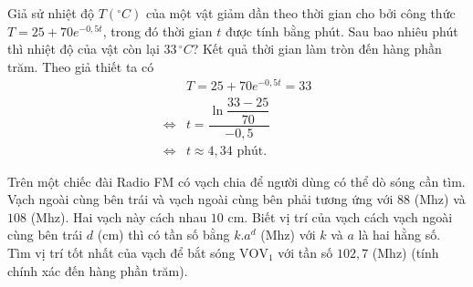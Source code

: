 \begin{bt}%

	Giả sử nhiệt độ $T({}^\circ C)$ của một vật giảm dần theo thời gian cho bởi công thức $T = 25 + 70e^{-0{,}5t}$, trong đó thời gian $t$ được tính bằng phút. Sau bao nhiêu phút thì nhiệt độ của vật còn lại $33\, {}^\circ C$? Kết quả thời gian làm tròn đến hàng phần trăm.
	\loigiai
	{
		Theo giả thiết ta có
		\begin{align*}
			&T = 25 + 70e^{-0{,}5t} = 33\\
			\Leftrightarrow &t = \dfrac{\ln\dfrac{33-25}{70}}{-0{,}5}\\
			\Leftrightarrow &t \approx 4{,}34 \text{ phút}.
		\end{align*}
	}
\end{bt}

\begin{bt}%

	Trên một chiếc đài Radio FM có vạch chia để người dùng có thể dò sóng cần tìm. Vạch ngoài cùng bên trái và vạch ngoài cùng bên phải tương ứng với $88$ (Mhz) và $108$ (Mhz). Hai vạch này cách nhau $10$ cm. Biết vị trí của vạch cách vạch ngoài cùng bên trái $d$ (cm) thì có tần số bằng $k.a^d$ (Mhz) với $k$ và $a$ là hai hằng số. Tìm vị trí tốt nhất của vạch để bắt sóng $\mathrm{VOV}_1$ với tần số $102{,}7$ (Mhz) (tính chính xác đến hàng phần trăm).
\end{bt}

